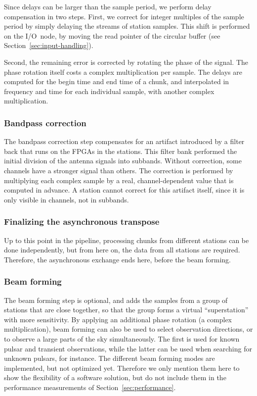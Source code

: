 \documentclass{sig-alternate}
\begin{document}
Since delays can be larger than the sample period, we perform delay
compensation in two steps.  First, we correct for integer multiples of
the sample period by simply delaying the streams of station samples.
This shift is performed on the I/O~node, by moving the read
pointer of the circular buffer (see Section~\ref{sec:input-handling}).

Second, the remaining error is corrected by rotating the phase of the
signal.  The phase rotation itself costs a complex multiplication per
sample.  
The delays are computed for the begin
time and end time of a chunk, and interpolated in frequency and time
for each individual sample, with another complex multiplication.


\subsubsection{Bandpass correction}

The bandpass correction step compensates for an artifact
introduced by a filter back that runs on the FPGAs in the stations.
This filter bank performed the initial division of the antenna signals into subbands.
Without correction, some channels have a stronger signal than others.
The correction is performed by multiplying each complex sample by a real,
channel-dependent value that is computed in advance.
A station cannot correct for this artifact itself, since it is only visible
in channels, not in subbands.


\subsubsection{Finalizing the asynchronous transpose}

Up to this point in the pipeline, processing chunks from different stations can be done
independently, but from here on, the data from all stations are required.
Therefore, the asynchronous exchange ends here, before the beam forming.


\subsubsection{Beam forming}

The beam forming step is optional, and adds the samples
from a group of stations that are close together, so that the group forms a virtual
``superstation'' with more sensitivity.
By applying an additional phase rotation (a complex multiplication), 
beam forming can also be used to select observation directions, or to
observe a large parts of the sky simultaneously.
The first is used for known pulsar and transient observations, while the latter can be 
used when searching for unknown pulsars, for instance.
The different beam forming modes are implemented, but not optimized yet.
Therefore we only mention them here to show the flexibility of a software solution, but do not include
them in the performance measurements of Section~\ref{sec:performance}.
\end{document}
